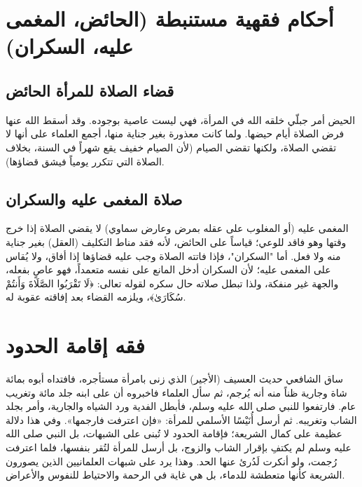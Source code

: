 \section{أحكام فقهية مستنبطة (الحائض، المغمى عليه، السكران)}

\subsection{قضاء الصلاة للمرأة الحائض}
الحيض أمر جبلّي خلقه الله في المرأة، فهي ليست عاصية بوجوده. وقد أسقط الله عنها فرض الصلاة أيام حيضها. ولما كانت معذورة بغير جناية منها، أجمع العلماء على أنها لا تقضي الصلاة، ولكنها تقضي الصيام (لأن الصيام خفيف يقع شهراً في السنة، بخلاف الصلاة التي تتكرر يومياً فيشق قضاؤها).

\subsection{صلاة المغمى عليه والسكران}
المغمى عليه (أو المغلوب على عقله بمرض وعارض سماوي) لا يقضي الصلاة إذا خرج وقتها وهو فاقد للوعي؛ قياساً على الحائض، لأنه فقد مناط التكليف (العقل) بغير جناية منه ولا فعل.
أما "السكران"، فإذا فاتته الصلاة وجب عليه قضاؤها إذا أفاق، ولا يُقاس على المغمى عليه؛ لأن السكران أدخل المانع على نفسه متعمداً، فهو عاصٍ بفعله، والجهة غير منفكة، ولذا تبطل صلاته حال سكره لقوله تعالى: ﴿لَا تَقْرَبُوا الصَّلَاةَ وَأَنتُمْ سُكَارَىٰ﴾، ويلزمه القضاء بعد إفاقته عقوبة له.

\section{فقه إقامة الحدود}
ساق الشافعي حديث العسيف (الأجير) الذي زنى بامرأة مستأجره، فافتداه أبوه بمائة شاة وجارية ظناً منه أنه يُرجم، ثم سأل العلماء فاخبروه أن على ابنه جلد مائة وتغريب عام. فارتفعوا للنبي صلى الله عليه وسلم، فأبطل الفدية ورد الشياه والجارية، وأمر بجلد الشاب وتغريبه. ثم أرسل أُنَيْسًا الأسلمي للمرأة: «فإن اعترفت فارجمها».
وفي هذا دلالة عظيمة على كمال الشريعة؛ فإقامة الحدود لا تُبنى على الشبهات، بل النبي صلى الله عليه وسلم لم يكتفِ بإقرار الشاب والزوج، بل أرسل للمرأة لتُقر بنفسها، فلما اعترفت رُجمت، ولو أنكرت لَدُرئ عنها الحد. وهذا يرد على شبهات العلمانيين الذين يصورون الشريعة كأنها متعطشة للدماء، بل هي غاية في الرحمة والاحتياط للنفوس والأعراض.
